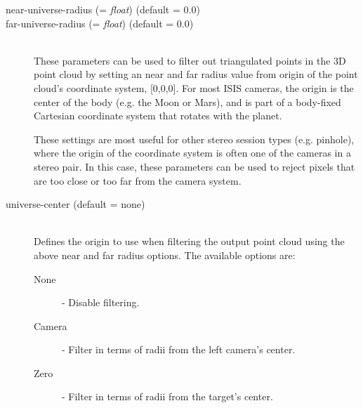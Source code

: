 \begin{description}
\item[near-universe-radius \textnormal{\small{(= \emph{float})}} (default = 0.0)]
\item[far-universe-radius \textnormal{\small{(= \emph{float})}} (default = 0.0)] \hfill \\
  These parameters can be used to filter out triangulated points in
  the 3D point cloud by setting an near and far radius value from
  origin of the point cloud's coordinate system, [0,0,0].  For most
  ISIS cameras, the origin is the center of the body (e.g. the Moon or
  Mars), and is part of a body-fixed Cartesian coordinate system that
  rotates with the planet.

  These settings are most useful for other stereo session types
  (e.g. pinhole), where the origin of the coordinate system is often
  one of the cameras in a stereo pair.  In this case, these parameters
  can be used to reject pixels that are too close or too far from the
  camera system.

\item[universe-center \textnormal (default = none)] \hfill \\
  Defines the origin to use when filtering the output point cloud
  using the above near and far radius options. The available options
  are:

  \begin{description}
    \item[None] - Disable filtering.
    \item[Camera] - Filter in terms of radii from the left camera's
      center.
    \item[Zero] - Filter in terms of radii from the target's center.
  \end{description}

\end{description}
